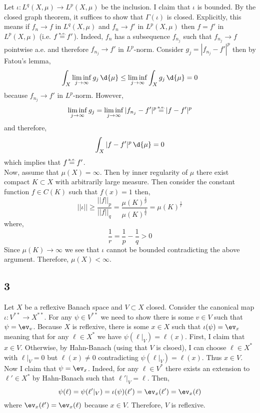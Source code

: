 \documentclass[12pt]{article}
\newcommand\eqae{\mathrel{\stackrel{\makebox[0pt]{\mbox{\normalfont\tiny a.e.}}}{=}}}
\begin{document}
Let $\iota : L^q(X, \mu) \to L^p(X, \mu)$ be the inclusion. I claim that $\iota$ is bounded. By the closed graph theorem, it suffices to show that $\Gamma(\iota)$ is closed. Explicitly, this means if $f_n \to f$ in $L^q(X, \mu)$ and $f_n \to f'$ in $L^p(X, \mu)$ then $f = f'$ in $L^p(X, \mu)$ (i.e. $f \eqae f'$). Indeed, $f_n$ has a subsequence $f_{n_j}$ such that $f_{n_j} \to f$ pointwise a.e. and therefore $f_{n_j} \to f'$ in $L^p$-norm. Consider $g_j = |f_{n_j} - f'|^p$ then by Fatou's lemma,
\[ \int_X \liminf_{j \to \infty} g_j \, \d{\mu} \le \liminf_{j \to \infty} \int_X g_j \, \d{\mu} = 0 \]
because $f_{n_j} \to f'$ in $L^p$-norm. However, 
\[ \liminf_{j \to \infty} g_j = \liminf_{j \to \infty} |f_{n_j} - f'|^p \eqae |f - f'|^p \]
and therefore,
\[ \int_X |f - f'|^p \, \d{\mu} = 0 \]
which implies that $f \eqae f'$.
\bigskip\\
Now, assume that $\mu(X) = \infty$. Then by inner regularity of $\mu$ there exist compact $K \subset X$ with arbitrarily large measure. Then consider the constant function $f \in C(K)$ such that $f(x) = 1$ then,
\[ ||\iota || \ge \frac{|| f ||_p}{|| f ||_q} = \frac{\mu(K)^{\frac{1}{p}}}{\mu(K)^{\frac{1}{q}}} = \mu(K)^{\frac{1}{r}} \]
where,
\[ \frac{1}{r} = \frac{1}{p} - \frac{1}{q} > 0 \]
Since $\mu(K) \to \infty$ we see that $\iota$ cannot be bounded contradicting the above argument. Therefore, $\mu(X) < \infty$. 

\subsection{3}

Let $X$ be a reflexive Banach space and $V \subset X$ closed. Consider the canonical map $\iota : V^{**} \to X^{**}$. For any $\psi \in V^{**}$ we need to show there is some $v \in V$ such that $\psi = \ev_v$. Because $X$ is reflexive, there is some $x \in X$ such that $\iota(\psi) = \ev_x$ meaning that for any $\ell \in X^*$ we have $\psi(\ell|_V) = \ell(x)$. First, I claim that $x \in V$. Otherwise, by Hahn-Banach (using that $V$ is clsoed), I can choose $\ell \in X^*$ with $\ell|_V = 0$ but $\ell(x) \neq 0$ contradicting $\psi(\ell|_V) = \ell(x)$. Thus $x \in V$. Now I claim that $\psi = \ev_x$. Indeed, for any $\ell \in V^*$ there exists an extension to $\ell' \in X^*$ by Hahn-Banach such that $\ell'|_V = \ell$. Then,
\[ \psi(\ell) = \psi(\ell'|_V) = \iota(\psi)(\ell') = \ev_x(\ell') = \ev_x(\ell) \]
where $\ev_x(\ell') = \ev_x(\ell)$ because $x \in V$. Therefore, $V$ is reflexive.
\end{document}
